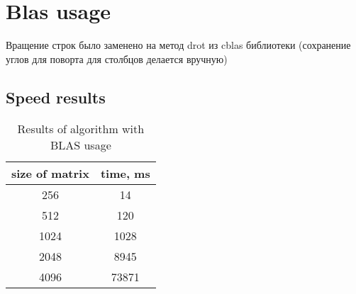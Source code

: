 \documentclass[12pt]{report}
\begin{document}
	\chapter{Blas usage}
	Вращение строк было заменено на метод drot из cblas библиотеки (сохранение углов для поворта для столбцов делается вручную)

	\section{Speed results}
	\begin{table}[h!]
		\centering
		\begin{tabular}{ | c | c | }
			\hline
			size of matrix & time, ms\\  [0.5ex]
			\hline\hline
			256 & 14 \\
			\hline
			512 & 120 \\
			\hline
			1024 & 1028 \\
			\hline
			2048 & 8945 \\
			\hline
			4096 & 73871 \\
			\hline
		\end{tabular}
		\caption{Results of algorithm with BLAS usage}
	\end{table}
\end{document}
